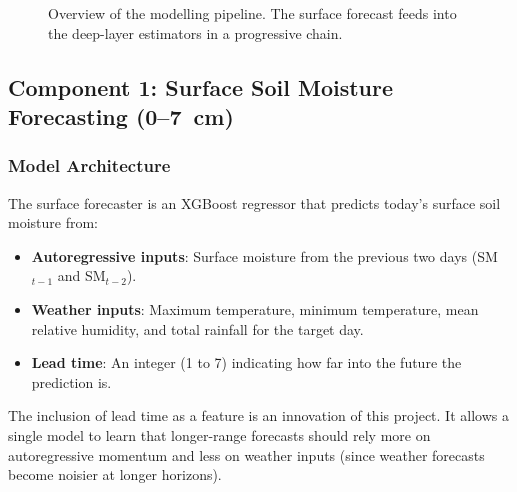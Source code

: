 \documentclass[12pt, a4paper]{article}
\begin{document}
\begin{figure}[H]
\centering
{}
\caption{Overview of the modelling pipeline. The surface forecast feeds into the deep-layer estimators in a progressive chain.}
\label{fig:pipeline}
\end{figure}

\subsection{Component 1: Surface Soil Moisture Forecasting (0--7~cm)}

\subsubsection{Model Architecture}

The surface forecaster is an XGBoost regressor that predicts today's surface soil moisture from:
\begin{itemize}
    \item \textbf{Autoregressive inputs}: Surface moisture from the previous two days (SM$_{t-1}$ and SM$_{t-2}$).
    \item \textbf{Weather inputs}: Maximum temperature, minimum temperature, mean relative humidity, and total rainfall for the target day.
    \item \textbf{Lead time}: An integer (1 to 7) indicating how far into the future the prediction is.
\end{itemize}

The inclusion of lead time as a feature is an innovation of this project. It allows a single model to learn that longer-range forecasts should rely more on autoregressive momentum and less on weather inputs (since weather forecasts become noisier at longer horizons).
\end{document}
